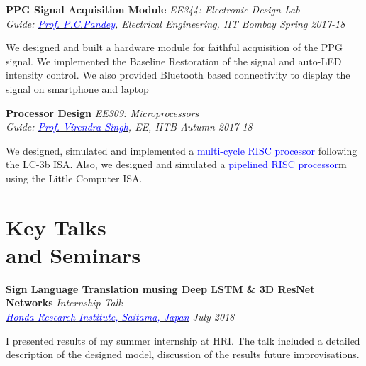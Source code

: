 \documentclass[margin,line]{res}
\newenvironment{list1}{
  \begin{list}{\ding{113}}{%
      \setlength{\itemsep}{0in}
      \setlength{\parsep}{0in} \setlength{\parskip}{0in}
      \setlength{\topsep}{0in} \setlength{\partopsep}{0in} 
      \setlength{\leftmargin}{0.17in}}}{\end{list}}
\begin{document}
\begin{resume}

{\bf PPG Signal Acquisition Module} \hfill \textit{EE344: Electronic Design Lab} \\
{\em Guide: \href{https://www.ee.iitb.ac.in/~pcpandey/}{\textcolor{blue}{Prof. P.C.Pandey}}, Electrical Engineering, IIT Bombay \hfill Spring 2017-18} \\
\vspace*{-.15in}
\begin{list1}
\item[] We designed and built a hardware module for faithful acquisition of the PPG signal. We implemented the Baseline Restoration of the signal and auto-LED intensity control. We also provided Bluetooth based connectivity to display the signal on smartphone and laptop
\end{list1}


{\bf Processor Design} \hfill \textit{EE309: Microprocessors} \\
{\em Guide: \href{https://www.ee.iitb.ac.in/~viren/}{\textcolor{blue}{Prof. Virendra Singh}}, EE, IITB \hfill Autumn 2017-18} \\
\vspace*{-.15in}
\begin{list1}
\item[] We designed, simulated and implemented a {\textcolor{blue} {multi-cycle RISC processor}} following the LC-3b ISA. Also, we designed and simulated a {\textcolor{blue} {pipelined RISC processor}}m using the Little Computer ISA.
\end{list1}



\section{\sc Key Talks \\ and Seminars}

{\bf Sign Language Translation musing Deep LSTM \& 3D ResNet Networks} \hfill {\em Internship Talk} \\
{\em \href{http://www.jp.honda-ri.com/en/}{\textcolor{blue}{Honda Research Institute, Saitama, Japan}} \hfill July 2018} \\
\vspace*{-.15in}
\begin{list1}
\item[] I presented results of my summer internship at HRI. The talk included a detailed description of the designed model, discussion of the results future improvisations. 
\end{list1}


\end{resume}
\end{document}
